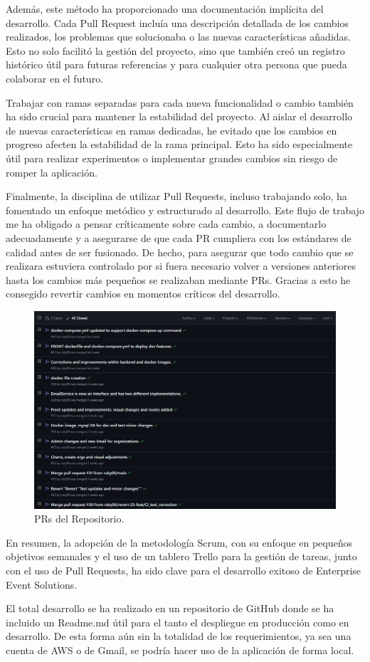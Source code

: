 Además, este método ha proporcionado una documentación implícita del desarrollo. Cada Pull Request incluía una descripción detallada de los 
cambios realizados, los problemas que solucionaba o las nuevas características añadidas. Esto no solo facilitó la gestión del proyecto, sino 
que también creó un registro histórico útil para futuras referencias y para cualquier otra persona que pueda colaborar en el futuro.

Trabajar con ramas separadas para cada nueva funcionalidad o cambio también ha sido crucial para mantener la estabilidad del proyecto. Al aislar el 
desarrollo de nuevas características en ramas dedicadas, he evitado que los cambios en progreso afecten la estabilidad de la rama principal. Esto ha 
sido especialmente útil para realizar experimentos o implementar grandes cambios sin riesgo de romper la aplicación.

Finalmente, la disciplina de utilizar Pull Requests, incluso trabajando solo, ha fomentado un enfoque metódico y estructurado al desarrollo. Este 
flujo de trabajo me ha obligado a pensar críticamente sobre cada cambio, a documentarlo adecuadamente y a asegurarse de que cada PR cumpliera con los 
estándares de calidad antes de ser fusionado. De hecho, para asegurar que todo cambio que se realizara estuviera controlado por si fuera necesario volver a versiones anteriores
hasta los cambios más pequeños se realizaban mediante PRs. Gracias a esto he consegido revertir cambios en momentos críticos del desarrollo.

\begin{figure}[h]
    \centering
    \includegraphics[width=\linewidth]{PRs.png}
    \caption{PRs del Repositorio.}
    \label{fig:metodologias2}
\end{figure}

En resumen, la adopción de la metodología Scrum, con su enfoque en pequeños objetivos semanales y el uso de un tablero Trello para la gestión de tareas, 
junto con el uso de Pull Requests, ha sido clave para el desarrollo exitoso de Enterprise Event Solutions.

El total desarrollo se ha realizado en un repositorio de GitHub donde se ha incluido un Readme.md útil para el tanto el despliegue en producción como en desarrollo. De esta forma
aún sin la totalidad de los requerimientos, ya sea una cuenta de AWS o de Gmail, se podría hacer uso de la aplicación de forma local.



